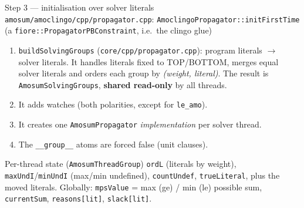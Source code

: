 \documentclass[aspectratio=169,11pt]{beamer}
\newcommand{\file}[1]{{\small\texttt{\color{acc}#1}}}
\begin{document}
\begin{frame}{Step 3 --- initialisation over solver literals}
\footnotesize
\file{amosum/amoclingo/cpp/propagator.cpp}: \texttt{AmoclingoPropagator::initFirstTime}
(a \texttt{fiore::PropagatorPBConstraint}, i.e.\ the clingo glue)
\begin{enumerate}\setlength\itemsep{2pt}
\item \texttt{buildSolvingGroups} (\file{core/cpp/propagator.cpp}): program literals $\to$ solver literals.
  It handles literals fixed to TOP/BOTTOM, merges equal solver literals and orders each group by \emph{(weight, literal)}.
  The result is \texttt{AmosumSolvingGroups}, \textbf{shared read-only} by all threads.
\item It adds watches (both polarities, except for \texttt{le\_amo}).
\item It creates one \texttt{AmosumPropagator} \emph{implementation} per solver thread.
\item The \texttt{\_\_group\_\_} atoms are forced false (unit clauses).
\end{enumerate}
\vspace{2mm}
\begin{block}{Per-thread state (\texttt{AmosumThreadGroup})}
\texttt{ordL} (literals by weight), \texttt{maxUndI}/\texttt{minUndI} (max/min undefined), \texttt{countUndef},
\texttt{trueLiteral}, plus the moved literals. Globally: \texttt{mpsValue} = max (ge) / min (le) possible sum,
\texttt{currentSum}, \texttt{reasons[lit]}, \texttt{slack[lit]}.
\end{block}
\end{frame}
\end{document}
